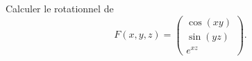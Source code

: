 
\begin{exercice}\label{exoOutilsMath-0053}

    Calculer le rotationnel de
    \begin{equation}
        F(x,y,z)=\begin{pmatrix}
            \cos(xy)    \\ 
            \sin(yz)    \\ 
            e^{xz}    
        \end{pmatrix}.
    \end{equation}
    
\end{exercice}
